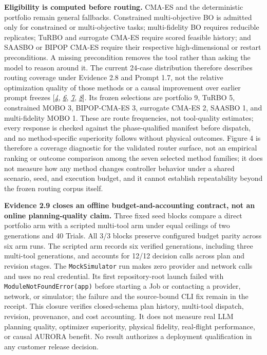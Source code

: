 \textbf{Eligibility is computed before routing.} CMA-ES and the
deterministic portfolio remain general fallbacks. Constrained
multi-objective BO is admitted only for constrained or multi-objective
tasks; multi-fidelity BO requires reducible replicates; TuRBO and
surrogate CMA-ES require scored feasible history; and SAASBO or BIPOP
CMA-ES require their respective high-dimensional or restart
preconditions. A missing precondition removes the tool rather than
asking the model to reason around it. The current 24-case distribution
therefore describes routing coverage under Evidence 2.8 and Prompt 1.7,
not the relative optimization quality of those methods or a causal
improvement over earlier prompt freezes
{[}\protect\hyperlink{ref_4}{\emph{4}}, \protect\hyperlink{ref_6}{\emph{6}}, \protect\hyperlink{ref_7}{\emph{7}}, \protect\hyperlink{ref_8}{\emph{8}}{]}.
Its frozen selections are portfolio 9, TuRBO 5, constrained MOBO 3,
BIPOP-CMA-ES 3, surrogate CMA-ES 2, SAASBO 1, and multi-fidelity MOBO 1.
These are route frequencies, not tool-quality estimates; every response
is checked against the phase-qualified manifest before dispatch, and no
method-specific superiority follows without physical outcomes.
Figure 4 is therefore a coverage diagnostic for the validated router
surface, not an empirical ranking or outcome comparison among the seven
selected method families; it does not measure how any method changes
controller behavior under a shared scenario, seed, and execution budget,
and it cannot establish repeatability beyond the frozen routing corpus itself.

\textbf{Evidence 2.9 closes an offline budget-and-accounting contract,
not an online planning-quality claim.} Three fixed seed blocks compare a
direct portfolio arm with a scripted multi-tool arm under equal ceilings
of two generations and 40 Trials. All 3/3 blocks preserve configured
budget parity across six arm runs. The scripted arm records six verified
generations, including three multi-tool generations, and accounts for
12/12 decision calls across plan and revision stages. The
\texttt{MockSimulator} run makes zero provider and network calls and uses
no real credential. Its first repository-root launch failed with
\texttt{ModuleNotFoundError(app)} before starting a Job or contacting a
provider, network, or simulator; the failure and the source-bound CLI fix
remain in the receipt. This closure verifies closed-schema plan history,
multi-tool dispatch, revision, provenance, and cost accounting. It does
not measure real LLM planning quality, optimizer superiority, physical
fidelity, real-flight performance, or causal AURORA benefit.
No result authorizes a deployment qualification in any customer release
decision.

